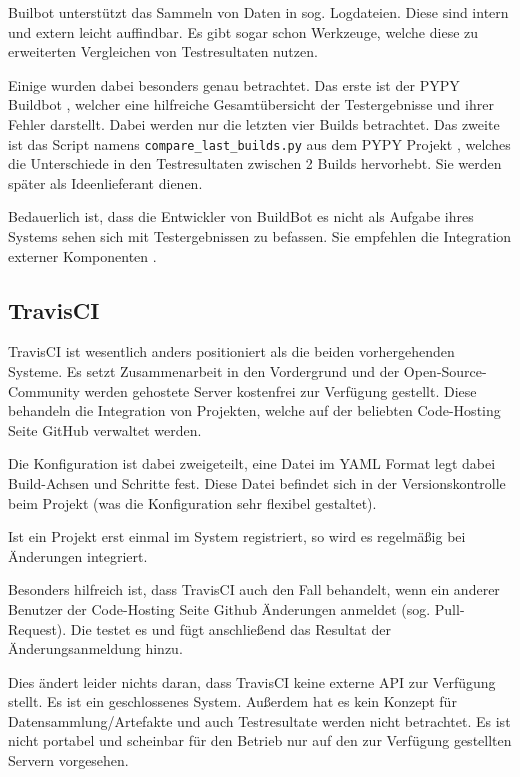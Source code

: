 Builbot unterst\"utzt das Sammeln von Daten in sog. Logdateien.
Diese sind intern und extern leicht auffindbar.
Es gibt sogar schon Werkzeuge, welche diese zu erweiterten Vergleichen von Testresultaten nutzen.

Einige wurden dabei besonders genau betrachtet.
Das erste ist der PYPY Buildbot \cite{pypy:overview}, welcher eine hilfreiche Gesamtübersicht der Testergebnisse und ihrer Fehler darstellt.
Dabei werden nur die letzten vier Builds betrachtet.
Das zweite ist das Script namens \verb|compare_last_builds.py|
aus dem PYPY Projekt \cite{pypy:diffscript} ,
welches die Unterschiede in den Testresultaten zwischen 2 Builds hervorhebt.
Sie werden sp\"ater als Ideenlieferant dienen.

Bedauerlich ist, dass die Entwickler von BuildBot es nicht als Aufgabe ihres Systems sehen
sich mit Testergebnissen zu befassen.
Sie empfehlen die Integration externer Komponenten \cite{buildbot:irc}.

\subsection{TravisCI}


TravisCI \cite{travisci:website} ist wesentlich anders positioniert als die beiden vorhergehenden Systeme.
Es setzt Zusammenarbeit in den Vordergrund und der Open-Source-Community werden gehostete Server
kostenfrei zur Verf\"ugung gestellt.
Diese behandeln die Integration von Projekten,
welche auf der beliebten Code-Hosting Seite GitHub verwaltet werden.

Die Konfiguration ist dabei zweigeteilt,
eine Datei im \ac{YAML} Format \cite{yaml:website} legt dabei Build-Achsen und Schritte fest.
Diese Datei befindet sich in der Versionskontrolle beim Projekt
(was die Konfiguration sehr flexibel gestaltet).

Ist ein Projekt erst einmal im System registriert,
so wird es regelmäßig bei Änderungen integriert.

Besonders hilfreich ist, dass TravisCI auch den Fall behandelt,
wenn ein anderer Benutzer der Code-Hosting Seite Github \"Anderungen anmeldet
\cite{github:pullreq} (sog. Pull-Request).
Die testet es und f\"ugt anschließend das Resultat der \"Anderungsanmeldung hinzu.

Dies \"andert leider nichts daran, dass TravisCI keine externe API zur Verfügung stellt.
Es ist ein geschlossenes System. Außerdem hat es kein Konzept f\"ur Datensammlung/Artefakte
und auch Testresultate werden nicht betrachtet.
Es ist nicht portabel und scheinbar f\"ur den Betrieb nur
auf den zur Verfügung gestellten Servern vorgesehen.


